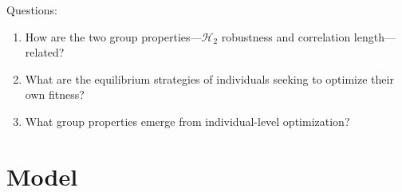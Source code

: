 \documentclass{article}
\DeclareRobustCommand{\cite}[1]{\citep{#1}}
\begin{document}
%
%
%
%
%
%
%
Questions:
\begin{enumerate}
\item How are the two group properties---$\mathscr{H}_2$ robustness and correlation length---related?
\item What are the equilibrium strategies of individuals seeking to optimize their own fitness?
\item What group properties emerge from individual-level optimization?
\end{enumerate}


\section{Model }
\end{document}
